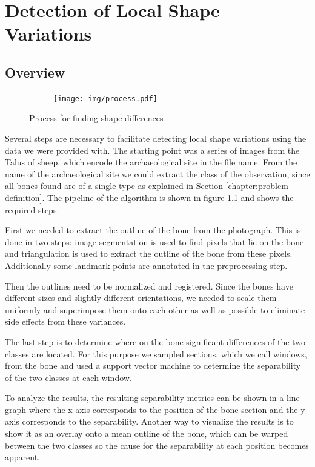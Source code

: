 \documentclass[pdftex,12pt,a4paper]{report}
\begin{document}
\chapter{Detection of Local Shape Variations}
\label{chapter:detecting-shape-variations}

\section{Overview}

\begin{figure}[h]
	\centering
	\begin{subfigure}[b]{0.95\textwidth}
		\centering
		\texttt{[image: img/process.pdf]}
	\end{subfigure}
	\caption{Process for finding shape differences}
	\label{fig:process}
\end{figure}

Several steps are necessary to facilitate detecting local shape variations using the data we were provided with. The starting point was a series of images from the Talus of sheep, which encode the archaeological site in the file name. From the name of the archaeological site we could extract the class of the observation, since all bones found are of a single type as explained in Section \ref{chapter:problem-definition}. The pipeline of the algorithm is shown in figure \ref{fig:process} and shows the required steps.

First we needed to extract the outline of the bone from the photograph. This is done in two steps: image segmentation is used to find pixels that lie on the bone and triangulation is used to extract the outline of the bone from these pixels. Additionally some landmark points are annotated in the preprocessing step.

Then the outlines need to be normalized and registered. Since the bones have different sizes and slightly different orientations, we needed to scale them uniformly and superimpose them onto each other as well as possible to eliminate side effects from these variances.

The last step is to determine where on the bone significant differences of the two classes are located. For this purpose we sampled sections, which we call windows, from the bone and used a support vector machine to determine the separability of the two classes at each window.

To analyze the results, the resulting separability metrics can be shown in a line graph where the x-axis corresponds to the position of the bone section and the y-axis corresponds to the separability. Another way to visualize the results is to show it as an overlay onto a mean outline of the bone, which can be warped between the two classes so the cause for the separability at each position becomes apparent.
\end{document}

